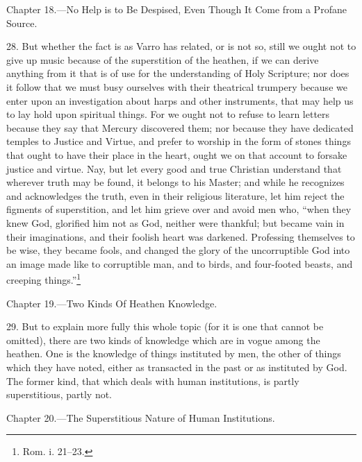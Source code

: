 
Chapter 18.—No Help is to Be Despised, Even Though It Come from a Profane Source.

28. But whether the fact is as Varro has related, or is not so, still we ought not to give up music because of the superstition of the heathen, if we can derive anything from it  that is of use for the understanding of Holy Scripture; nor does it follow that we must busy ourselves with their theatrical trumpery because we enter upon an investigation about harps and other instruments, that may help us to lay hold upon spiritual things. For we ought not to refuse to learn letters because they say that Mercury discovered them; nor because they have dedicated temples to Justice and Virtue, and prefer to worship in the form of stones things that ought to have their place in the heart, ought we on that account to forsake justice and virtue. Nay, but let every good and true Christian understand that wherever truth may be found, it belongs to his Master; and while he recognizes and acknowledges the truth, even in their religious literature, let him reject the figments of superstition, and let him grieve over and avoid men who, “when they knew God, glorified him not as God, neither were thankful; but became vain in their imaginations, and their foolish heart was darkened. Professing themselves to be wise, they became fools, and changed the glory of the uncorruptible God into an image made like to corruptible man, and to birds, and four-footed beasts, and creeping things.”\footnote{Rom. i. 21–23.}


Chapter 19.—Two Kinds Of Heathen Knowledge.

29. But to explain more fully this whole topic (for it is one that cannot be omitted), there are two kinds of knowledge which are in vogue among the heathen. One is the knowledge of things instituted by men, the other of things which they have noted, either as transacted in the past or as instituted by God. The former kind, that which deals with human institutions, is partly superstitious, partly not.


Chapter 20.—The Superstitious Nature of Human Institutions.

